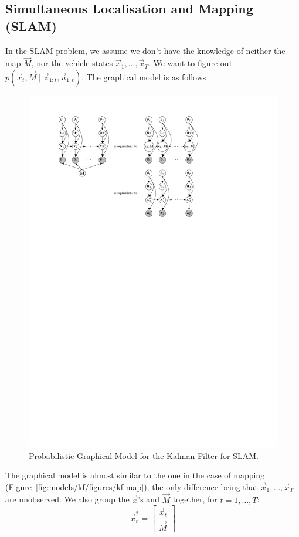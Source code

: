 \subsection{Simultaneous Localisation and Mapping (SLAM)}
In the SLAM problem, we assume we don't have the knowledge of neither the map $\vec M$, nor the vehicle states $\vec x_1, \dotsc, \vec x_T$. We want to figure out $p(\vec x_t, \vec M \mid \vec z_{1:t}, \vec u_{1:t})$. The graphical model is as follows
\begin{figure}[!htb]
\centering
\includegraphics[scale=1]{models/kf/figures/kf-slam}
\caption{Probabilistic Graphical Model for the Kalman Filter for SLAM.}
\label{fig:models/kf/figures/kf-slam}
\end{figure}

The graphical model is almost similar to the one in the case of mapping (Figure~\ref{fig:models/kf/figures/kf-map}), the only difference being that $\vec x_1, \dotsc, \vec x_T$ are unobserved. We also group the $\vec x$'s and $\vec M$ together, for $t = 1, \dotsc, T$:
\begin{equation}
	\vec x_t^\ast =
		\begin{bmatrix}
			\vec x_t \\
			\vec M
		\end{bmatrix}
\end{equation}

